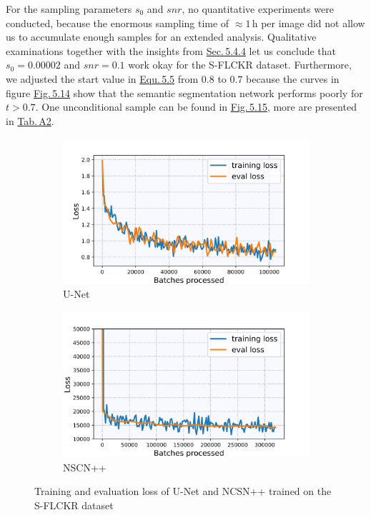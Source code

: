 For the sampling parameters $s_0$ and $snr$, no quantitative experiments were conducted, because the enormous sampling time of $\approx1$\,h per image did not allow us to accumulate enough samples for an extended analysis. Qualitative examinations together with the insights from \hyperref[sec:5.4.4]{Sec.\,5.4.4} let us conclude that $s_0=0.00002$ and $snr=0.1$ work okay for the S-FLCKR dataset. Furthermore, we adjusted the start value in \hyperref[equ:5.5]{Equ.\,5.5} from $0.8$ to $0.7$ because the curves in figure \hyperref[fig:5.14]{Fig.\,5.14} show that the semantic segmentation network performs poorly for $t>0.7$. One unconditional sample can be found in \hyperref[fig:5.15]{Fig.\,5.15}, more are presented in \hyperref[tab:a2]{Tab.\,A2}.
%
\begin{figure}[] \label{fig:5.13}
    \centering
    \begin{subfigure}[b]{0.49\textwidth}
        \includegraphics[width=\textwidth]{Chapters/figures/experiments/flickr/loss_flickr_seg.jpg}
        \caption{U-Net}
    \end{subfigure}
    \begin{subfigure}[b]{0.49\textwidth}
        \includegraphics[width=\textwidth]{Chapters/figures/experiments/flickr/loss_flickr_ncsn.jpg}
        \caption{NSCN++}
    \end{subfigure}
    \caption[Losses of U-Net/NCSN++ on S-FLCKR dataset]{Training and evaluation loss of U-Net and NCSN++ trained on the S-FLCKR dataset}
\end{figure}
